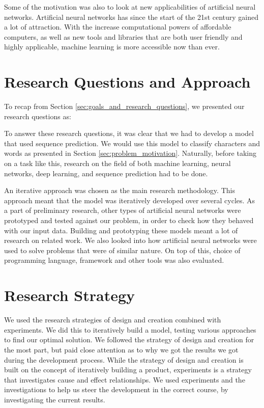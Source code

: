 Some of the motivation was also to look at new applicabilities of artificial neural networks. Artificial neural networks has since the start of the 21st century gained a lot of attraction. With the increase computational powers of affordable computers, as well as new tools and libraries that are both user friendly and highly applicable, machine learning is more accessible now than ever. 



\section{Research Questions and Approach}
To recap from Section \ref{sec:goals_and_research_questions}, we presented our research questions as:



To answer these research questions, it was clear that we had to develop a model that used sequence prediction. We would use this model to classify characters and words as presented in Section \ref{sec:problem_motivation}. Naturally, before taking on a task like this, research on the field of both machine learning, neural networks, deep learning, and sequence prediction had to be done.

An iterative approach was chosen as the main research methodology. This approach meant that the model was iteratively developed over several cycles. As a part of preliminary research, other types of artificial neural networks were prototyped and tested against our problem, in order to check how they behaved with our input data. Building and prototyping these models meant a lot of research on related work. We also looked into how artificial neural networks were used to solve problems that were of similar nature. On top of this, choice of programming language, framework and other tools was also evaluated.


\section{Research Strategy}
We used the research strategies of design and creation combined with experiments. We did this to iteratively build a model, testing various approaches to find our optimal solution. We followed the strategy of design and creation for the most part, but paid close attention as to why we got the results we got during the development process. While the strategy of design and creation is built on the concept of iteratively building a product, experiments is a strategy that investigates cause and effect relationships. We used experiments and the investigations to help us steer the development in the correct course, by investigating the current results.

